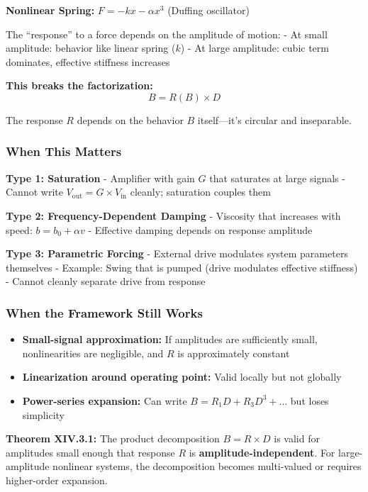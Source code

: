 \documentclass[
]{article}
\providecommand{\tightlist}{%
  \setlength{\itemsep}{0pt}\setlength{\parskip}{0pt}}
\begin{document}
\textbf{Nonlinear Spring:} \(F = -kx - \alpha x^3\) (Duffing oscillator)

The ``response'' to a force depends on the amplitude of motion: - At
small amplitude: behavior like linear spring (\(k\)) - At large
amplitude: cubic term dominates, effective stiffness increases

\textbf{This breaks the factorization:} \[B = R(B) \times D\]

The response \(R\) depends on the behavior \(B\) itself---it's circular
and inseparable.

\subsubsection{When This Matters}\label{when-this-matters}

\textbf{Type 1: Saturation} - Amplifier with gain \(G\) that saturates
at large signals - Cannot write
\(V_{\text{out}} = G \times V_{\text{in}}\) cleanly; saturation couples
them

\textbf{Type 2: Frequency-Dependent Damping} - Viscosity that increases
with speed: \(b = b_0 + \alpha v\) - Effective damping depends on
response amplitude

\textbf{Type 3: Parametric Forcing} - External drive modulates system
parameters themselves - Example: Swing that is pumped (drive modulates
effective stiffness) - Cannot cleanly separate drive from response

\subsubsection{When the Framework Still
Works}\label{when-the-framework-still-works-1}

\begin{itemize}
\tightlist
\item
  \textbf{Small-signal approximation:} If amplitudes are sufficiently
  small, nonlinearities are negligible, and \(R\) is approximately
  constant
\item
  \textbf{Linearization around operating point:} Valid locally but not
  globally
\item
  \textbf{Power-series expansion:} Can write
  \(B = R_1 D + R_3 D^3 + \ldots\) but loses simplicity
\end{itemize}

\textbf{Theorem XIV.3.1:} The product decomposition \(B = R \times D\)
is valid for amplitudes small enough that response \(R\) is
\textbf{amplitude-independent}. For large-amplitude nonlinear systems,
the decomposition becomes multi-valued or requires higher-order
expansion.
\end{document}
